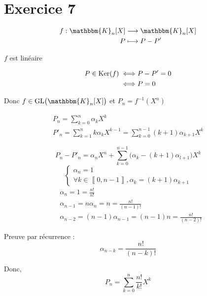\part{Exercice 7}

\begin{align*}
	f: \mathbbm{K}_n[X] &\longrightarrow \mathbbm{K}_n[X] \\
	P &\longmapsto P - P'
\end{align*}

$f$ est linéaire

\begin{align*}
	P \in \operatorname{Ker}(f) \iff& P - P' = 0\\
	\iff& P = 0
\end{align*}

Donc $f \in \mathrm{GL}\big(\mathbbm{K}_n[X]\big)$ et $P_n = f^{-1}(X^n)$

\begin{align*}
	P_n = \sum_{k=0}^n \alpha_k X^k\\
	P'_n = \sum_{k=1}^n k \alpha_k X^{k-1} = \sum_{k=0}^{n-1} (k+1)\alpha_{k+1}X^{k}
\end{align*}

\[
	P_n - P'_n = \alpha_n X^n + \sum_{k=0}^{n-1}\big(\alpha_k - (k+1) \alpha_{l + 1}\big)X^k
\] \[
	\begin{cases}
		\alpha_n = 1\\
		\forall k \in \left\llbracket 0, n-1 \right\rrbracket, \alpha_k = (k+1)\alpha_{k+1}
	\end{cases}
\]
\begin{align*}
	&\alpha_n = 1 = \frac{n!}{n!}\\
	&\alpha_{n-1} = n \alpha_n = n = \frac{n!}{(n-1)!}\\
	&\alpha_{n-2} = (n-1) \alpha_{n-1} = (n-1)n = \frac{n!}{(n-2)!}
\end{align*}

Preuve par récurrence : \[
	\alpha_{n-k} = \frac{n!}{(n-k)!}
\] 

Donc, \[
	P_n = \sum_{k=0}^n \frac{n!}{k!}X^k
\]
